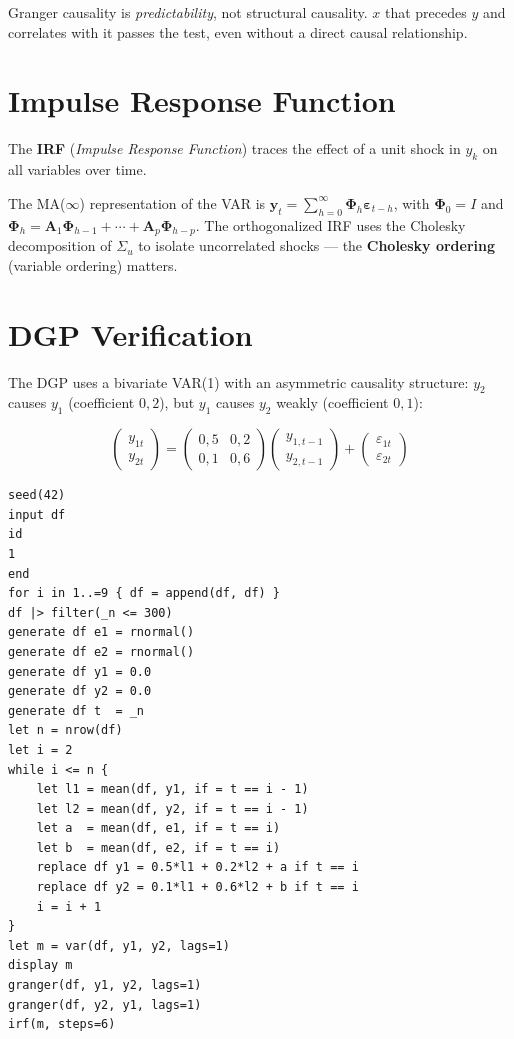 \begin{nota}
  Granger causality is \emph{predictability}, not structural causality.
  $x$ that precedes $y$ and correlates with it passes the test,
  even without a direct causal relationship.
\end{nota}

\section{Impulse Response Function}

The \textbf{IRF} (\emph{Impulse Response Function}) traces the effect of a
unit shock in $y_k$ on all variables over time.

The MA($\infty$) representation of the VAR is $\mathbf{y}_t = \sum_{h=0}^\infty
\mathbf{\Phi}_h \boldsymbol{\varepsilon}_{t-h}$, with $\mathbf{\Phi}_0 = I$
and $\mathbf{\Phi}_h = \mathbf{A}_1 \mathbf{\Phi}_{h-1} + \cdots +
\mathbf{A}_p \mathbf{\Phi}_{h-p}$. The orthogonalized IRF uses the Cholesky
decomposition of $\Sigma_u$ to isolate uncorrelated shocks --- the
\textbf{Cholesky ordering} (variable ordering) matters.

\section{DGP Verification}

The DGP uses a bivariate VAR(1) with an asymmetric causality structure:
$y_2$ causes $y_1$ (coefficient $0{,}2$), but $y_1$ causes $y_2$
weakly (coefficient $0{,}1$):

\[
  \begin{pmatrix} y_{1t} \\ y_{2t} \end{pmatrix}
  = \begin{pmatrix} 0{,}5 & 0{,}2 \\ 0{,}1 & 0{,}6 \end{pmatrix}
    \begin{pmatrix} y_{1,t-1} \\ y_{2,t-1} \end{pmatrix}
  + \begin{pmatrix} \varepsilon_{1t} \\ \varepsilon_{2t} \end{pmatrix}
\]

\begin{lstlisting}[caption={VAR(1) DGP --- Granger and IRF}]
seed(42)
input df
id
1
end
for i in 1..=9 { df = append(df, df) }
df |> filter(_n <= 300)
generate df e1 = rnormal()
generate df e2 = rnormal()
generate df y1 = 0.0
generate df y2 = 0.0
generate df t  = _n
let n = nrow(df)
let i = 2
while i <= n {
    let l1 = mean(df, y1, if = t == i - 1)
    let l2 = mean(df, y2, if = t == i - 1)
    let a  = mean(df, e1, if = t == i)
    let b  = mean(df, e2, if = t == i)
    replace df y1 = 0.5*l1 + 0.2*l2 + a if t == i
    replace df y2 = 0.1*l1 + 0.6*l2 + b if t == i
    i = i + 1
}
let m = var(df, y1, y2, lags=1)
display m
granger(df, y1, y2, lags=1)
granger(df, y2, y1, lags=1)
irf(m, steps=6)
\end{lstlisting}

